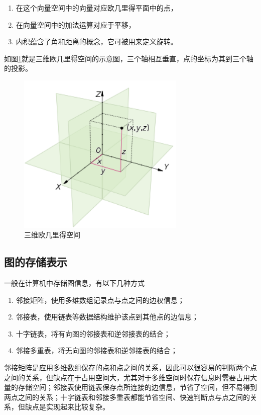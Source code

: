 \begin{enumerate}[.]
    \item 在这个向量空间中的向量对应欧几里得平面中的点，
    \item 在向量空间中的加法运算对应于平移，
    \item 内积蕴含了角和距离的概念，它可被用来定义旋转。
\end{enumerate}\par
如图\ref{fig:3axis}就是三维欧几里得空间的示意图，三个轴相互垂直，点的坐标为其到三个轴的投影。
\begin{figure}[htbp]
  \centering
  \includegraphics[width=8cm]{figures/3axis.png}
  \caption{三维欧几里得空间}  
  \label{fig:3axis}
\end{figure}
\subsection{图的存储表示}
一般在计算机中存储图信息，有以下几种方式
\begin{enumerate}
    \item 邻接矩阵，使用多维数组记录点与点之间的边权信息；
    \item 邻接表，使用链表等数据结构维护该点到其他点的边信息；
    \item 十字链表，将有向图的邻接表和逆邻接表的结合；
    \item 邻接多重表，将无向图的邻接表和逆邻接表的结合；
\end{enumerate}\par
邻接矩阵是应用多维数组保存的点和点之间的关系，因此可以很容易的判断两个点之间的关系，但缺点在于占用空间大，尤其对于多维空间时保存信息时需要占用大量的存储空间；邻接表使用链表保存点所连接的边信息，节省了空间，但不易得到两点之间的关系；十字链表和邻接多重表都能节省空间、快速判断点与点之间的关系，但缺点是实现起来比较复杂。

